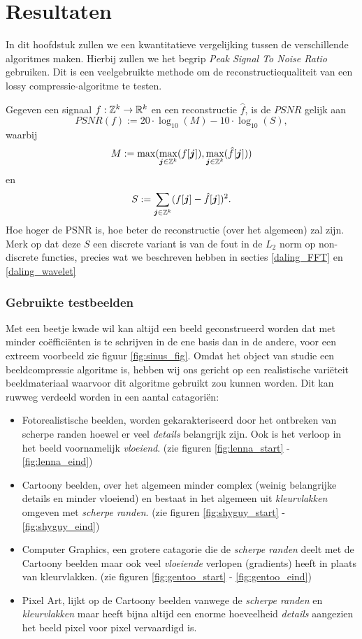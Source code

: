 \chapter{Resultaten}
\label{sectie_psnr}
In dit hoofdstuk zullen we een kwantitatieve vergelijking tussen de verschillende algoritmes maken. Hierbij zullen we het begrip \emph{Peak Signal To Noise Ratio} gebruiken. Dit is een veelgebruikte methode om de reconstructiequaliteit van een lossy compressie-algoritme te testen.

\begin{definitie}
  Gegeven een signaal $f: \mathbb{Z}^k \to \mathbb{R}^k$ en een reconstructie $\hat f$, is de $PSNR$ gelijk aan
  \[
  PSNR(f) := 20 \cdot \log_{10}( M ) - 10 \cdot \log_{10}(S),
  \]
  waarbij
  \[
  M := \max( \max_{\boldsymbol j \in \mathbb{Z}^k} (f[\boldsymbol j]), \max_{\boldsymbol j \in \mathbb{Z}^k} (\hat f[\boldsymbol j]))
  \]
  en
  \[
  S := \sum_{\boldsymbol j \in \mathbb{Z}^k} (f[\boldsymbol j] - \hat f[\boldsymbol j])^2.
  \]
  Hoe hoger de PSNR is, hoe beter de reconstructie (over het algemeen) zal zijn.
  Merk op dat deze $S$ een discrete variant is van de fout in de $L_2$ norm op non-discrete functies,
  precies wat we beschreven hebben in secties \ref{daling_FFT} en \ref{daling_wavelet}
\end{definitie}

\subsection{Gebruikte testbeelden}
Met een beetje kwade wil kan altijd een beeld geconstrueerd worden dat met minder co\"effici\"enten is te schrijven
in de ene basis dan in de andere, voor een extreem voorbeeld zie figuur \ref{fig:sinus_fig}.
Omdat het object van studie een beeldcompressie algoritme is, hebben wij ons gericht op een realistische vari\"eteit
beeldmateriaal waarvoor dit algoritme gebruikt zou kunnen worden. 
Dit kan ruwweg verdeeld worden in een aantal catagori\"en:
\begin{itemize}
\item Fotorealistische beelden, worden gekarakteriseerd door het ontbreken van scherpe randen hoewel
  er veel \emph{details} belangrijk zijn. Ook is het verloop in het beeld voornamelijk \emph{vloeiend}. 
  (zie figuren \ref{fig:lenna_start} - \ref{fig:lenna_eind})
\item Cartoony beelden, over het algemeen minder complex (weinig belangrijke details en minder vloeiend) 
  en bestaat in het algemeen uit \emph{kleurvlakken} omgeven met \emph{scherpe randen}.
  (zie figuren \ref{fig:shyguy_start} - \ref{fig:shyguy_eind})
\item Computer Graphics, een grotere catagorie die de \emph{scherpe randen} deelt met de Cartoony beelden
  maar ook veel \emph{vloeiende} verlopen (gradients) heeft in plaats van kleurvlakken.
  (zie figuren \ref{fig:gentoo_start} - \ref{fig:gentoo_eind})
\item Pixel Art, lijkt op de Cartoony beelden vanwege de \emph{scherpe randen} en \emph{kleurvlakken}
  maar heeft bijna altijd een enorme hoeveelheid \emph{details} aangezien het beeld pixel voor pixel vervaardigd is.
\end{itemize}


